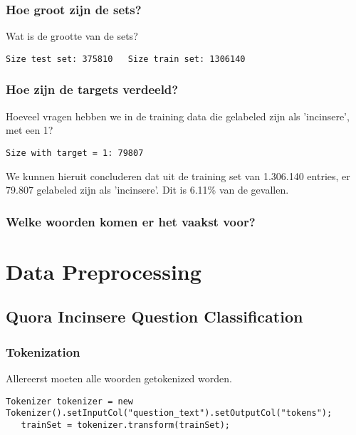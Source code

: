 \subsubsection{Hoe groot zijn de sets?}
Wat is de grootte van de sets?
\begin{lstlisting}[style=commentStyle]
Size test set: 375810   Size train set: 1306140
\end{lstlisting}
\subsubsection{Hoe zijn de targets verdeeld?}
Hoeveel vragen hebben we in de training data die gelabeled zijn als 'incinsere', met een 1?

\begin{lstlisting}[style=commentStyle]
    Size with target = 1: 79807
\end{lstlisting}
We kunnen hieruit concluderen dat uit de training set van 1.306.140 entries, er 79.807 gelabeled zijn als 'incinsere'. Dit is 6.11\% van de gevallen.

\subsubsection{Welke woorden komen er het vaakst voor?}

\section{Data Preprocessing}
\label{sec:preprocessing}
\subsection{Quora Incinsere Question Classification}
\subsubsection{Tokenization}
Allereerst moeten alle woorden getokenized worden.
\begin{lstlisting}[style=codeStyle]
   Tokenizer tokenizer = new Tokenizer().setInputCol("question_text").setOutputCol("tokens");
   trainSet = tokenizer.transform(trainSet);
\end{lstlisting}

